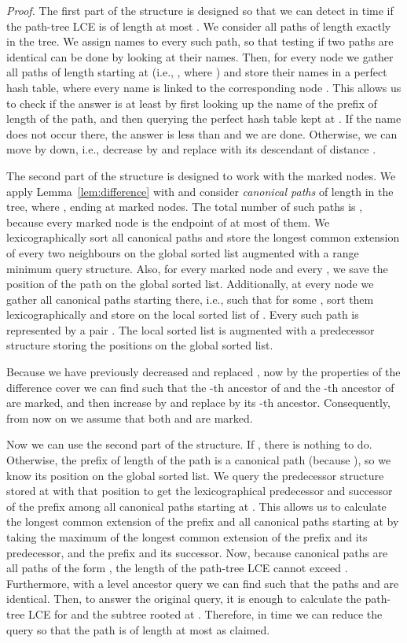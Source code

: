 \documentclass [10pt]{article}
\newenvironment{proof}{\noindent\emph{Proof. }}{}
\begin{document}
\begin{proof}
The first part of the structure is designed so that we can detect in  time if the path-tree LCE is of length at most .
We consider all paths of length exactly  in the tree. We assign names to every such path, so that testing if two paths are identical
can be done by looking at their names. Then, for every node  we gather all paths of length  starting at  (i.e.,
, where ) and store their names in a perfect hash table, where every name
is linked to the corresponding node . This allows us to check if the answer is at least  by first looking
up the name of the prefix of length  of the path, and then querying the perfect hash table kept at .
If the name does not occur there, the answer is less than  and we are done. Otherwise, we can move by  down, i.e.,
decrease  by  and replace  with its descendant of distance . 


The second part of the structure is designed to work with the marked nodes. We apply Lemma~\ref{lem:difference} with 
and consider \emph{canonical paths} of length  in the tree, where , ending at marked nodes. The total
number of such paths is , because every marked node is the endpoint of at most  of them.
We lexicographically sort all canonical paths and store the longest common extension of every two neighbours on the global
sorted list augmented with a range minimum query structure. Also, for every marked node  and every  , we save the position of the path
 on the global sorted list. 
Additionally, at every node  we gather all canonical paths starting there, i.e.,  such that 
for some , sort them lexicographically and store on the local sorted list of . Every such path is represented by a pair .
The local sorted list is augmented with a predecessor structure storing the positions on the global sorted list.

Because we have previously decreased  and replaced , now by the properties of the difference cover we can find 
such that the -th ancestor of  and the -th ancestor of  are marked, and then increase  by  and replace
 by its -th ancestor. Consequently, from now on we assume that both  and  are marked.

Now we can use the second part of the structure. If , there is nothing to do. Otherwise, the prefix of
length  of the path is a canonical path (because ),
so we know its position on the global sorted list.
We query the predecessor structure stored at  with that position to get the lexicographical predecessor and successor of the prefix
among all canonical paths starting at . This allows us to calculate the longest common extension  of the prefix and all canonical paths
starting at  by taking the maximum of the longest common extension of the prefix and its predecessor, and the prefix and its successor.
Now, because canonical paths are all paths of the form , the length of the path-tree LCE cannot exceed .
Furthermore, with a level ancestor query we can find  such that the paths  and
 are identical. Then, to answer the original query, it is enough to calculate the path-tree LCE for
 and the subtree rooted at .
Therefore, in  time we can reduce the query so that the path is of length at most  as claimed.


\end{proof}
\end{document}
